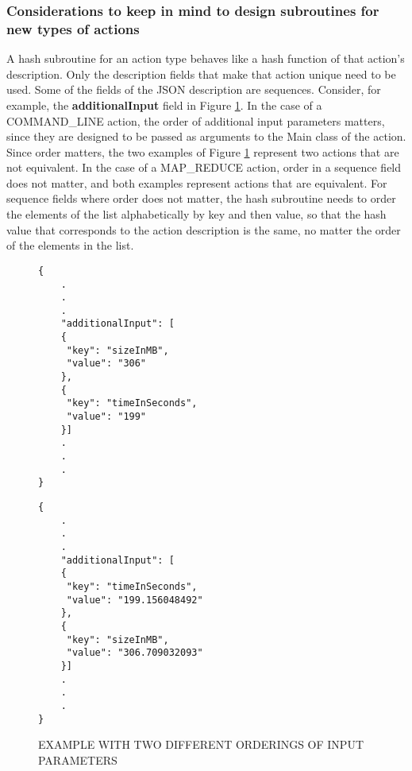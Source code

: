 \subsubsection{Considerations to keep in mind to design subroutines for new types of actions}
A hash subroutine for an action type behaves like a hash function of that action's description.  Only the description fields that make that action unique need to be used.  Some of the fields of the JSON description are sequences.  Consider, for example, the \textbf{additionalInput} field in Figure \ref{fig:action_parameters_ordering}.  In the case of a COMMAND\_LINE action, the order of additional input parameters matters, since they are designed to be passed as arguments to the Main class of the action.  Since order matters, the two examples of Figure \ref{fig:action_parameters_ordering} represent two actions that are not equivalent. In the case of a MAP\_REDUCE action, order in a sequence field does not matter, and both examples represent actions that are equivalent. For sequence fields where order does not matter, the hash subroutine needs to order the elements of the list alphabetically by key and then value, so that the hash value that corresponds to the action description is the same, no matter the order of the elements in the list.

\begin{figure}[htbp]
\centering
\begin{singlespace}
\begin{minipage}[b]{7 cm}
\begin{mdframed}
\begin{verbatim}
{
    .
    .
    .
    "additionalInput": [
    {
     "key": "sizeInMB",
     "value": "306"
    }, 
    {
     "key": "timeInSeconds", 
     "value": "199"
    }]
    .
    .
    .
}
\end{verbatim}
\end{mdframed}
\end{minipage}
\begin{minipage}[b]{7 cm}
\begin{mdframed}
\begin{verbatim}
{
    .
    .
    .
    "additionalInput": [
    {
     "key": "timeInSeconds", 
     "value": "199.156048492"
    },
    {
     "key": "sizeInMB",
     "value": "306.709032093"
    }]
    .
    .
    .
}
\end{verbatim}
\end{mdframed}
\end{minipage}
\end{singlespace}
\caption{EXAMPLE WITH TWO DIFFERENT ORDERINGS OF INPUT PARAMETERS}
\label{fig:action_parameters_ordering}
\end{figure}



